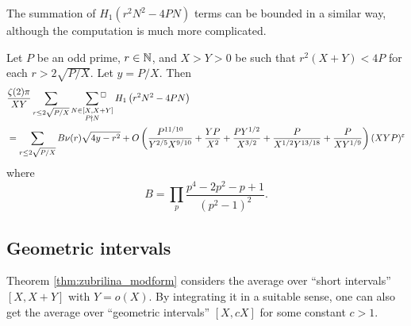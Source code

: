The summation of $H_1(r^2 N^2 - 4PN)$ terms can be bounded in a similar way, although the computation is much more complicated.

\begin{proposition}
    Let $P$ be an odd prime, $r \in \mathbb{N}$, and $X > Y > 0$ be such that $r^2(X + Y) < 4 P$ for each $r > 2 \sqrt{P/X}$. Let $y = P/X$. Then
    \begin{align*}
        &\frac{\zeta(2) \pi}{ XY} \sum_{r \le 2 \sqrt{P/X}} \,\,\,\, \sideset{}{{}^\square}\sum_{\substack{N \in [X, X + Y] \\ P \nmid N}}  H_1\left(r^2 N^2 - 4 PN\right) \\
        &= \sum_{r \le 2 \sqrt{P/X}} B\nu(r) \sqrt{4y - r^2} + O\left(\frac{P^{11/10}}{Y^{2/5}X^{9/10}} + \frac{YP}{X^2} + \frac{PY^{1/2}}{X^{3/2}} + \frac{P}{X^{1/2} Y^{13/18}} + \frac{P}{XY^{1/9}}\right) (XYP)^\varepsilon
    \end{align*}
    where
    \[
    B = \prod_p \frac{p^4 - 2p^2 - p + 1}{(p^2 - 1)^2}.
    \]
\end{proposition}

\subsection{Geometric intervals}

Theorem \ref{thm:zubrilina_modform} considers the average over ``short intervals'' $[X, X + Y]$ with $Y = o(X)$.
By integrating it in a suitable sense, one can also get the average over ``geometric intervals'' $[X, cX]$ for some constant $c > 1$.

